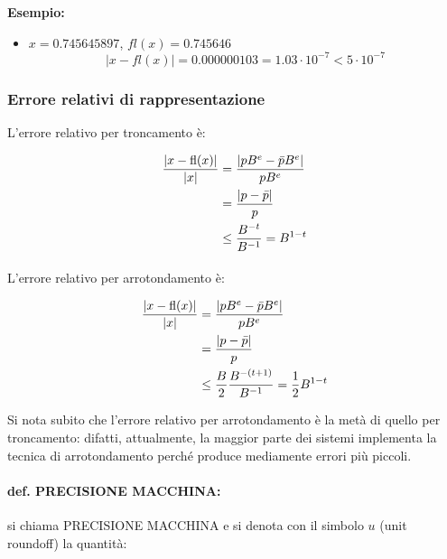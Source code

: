 \documentclass[a4paper, 11pt]{article}
\begin{document}
        \textbf{Esempio:}

        \begin{itemize}
            \item $x =0.745645897$, $fl(x)=0.745646 $
            \[
                |x-fl(x)| = 0.000000103 = 1.03\cdot10^{-7} < 5\cdot10^{-7}
            \]
        \end{itemize}



        \subsubsection{Errore relativi di rappresentazione}
        L'errore relativo per troncamento è: 



        \begin{align}
            \frac{\left| x - \text{fl}(x) \right|}{\left | x \right |} &= \frac{\left| pB^e - \bar{p}B^e \right|}{pB^e} \notag \\
            &= \frac{\left| p - \bar{p} \right|}{p} \notag \\
            &\leq \frac{B^{-t}}{B^{-1}} = B^{1-t} \notag
        \end{align}



        \paragraph{}
        L'errore relativo per arrotondamento è: 



        \begin{align}
            \frac{\left| x - \text{fl}(x) \right|}{\left | x \right |} &= \frac{\left| pB^e - \bar{p}B^e \right|}{pB^e} \notag \\
            &= \frac{\left| p - \bar{p} \right|}{p} \notag \\
            &\leq \frac{B}{2} \frac{B^{-(t+1)}}{B^{-1}} = \frac{1}{2} B^{1-t} \notag
        \end{align}



        Si nota subito che l'errore relativo per arrotondamento è la metà di quello per troncamento:
        difatti, attualmente, la maggior parte dei sistemi implementa la tecnica di arrotondamento perché produce mediamente errori più piccoli.

        \paragraph{def. PRECISIONE MACCHINA: }
        si chiama PRECISIONE MACCHINA e si denota con il simbolo $u$ (unit roundoff) la quantità:
\end{document}
